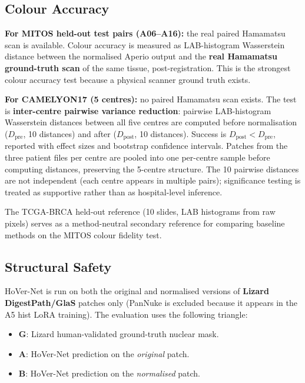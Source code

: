 \documentclass[a4paper,twoside,12pt]{report}
\begin{document}
\subsection{Colour Accuracy}

\textbf{For MITOS held-out test pairs (A06--A16):} the real paired Hamamatsu scan is available. Colour accuracy is measured as LAB-histogram Wasserstein distance between the normalised Aperio output and the \textbf{real Hamamatsu ground-truth scan} of the same tissue, post-registration. This is the strongest colour accuracy test because a physical scanner ground truth exists.

\textbf{For CAMELYON17 (5 centres):} no paired Hamamatsu scan exists. The test is \textbf{inter-centre pairwise variance reduction}: pairwise LAB-histogram Wasserstein distances between all five centres are computed before normalisation ($D_{\text{pre}}$, 10 distances) and after ($D_{\text{post}}$, 10 distances). Success is $D_{\text{post}} < D_{\text{pre}}$, reported with effect sizes and bootstrap confidence intervals. Patches from the three patient files per centre are pooled into one per-centre sample before computing distances, preserving the 5-centre structure. The 10 pairwise distances are not independent (each centre appears in multiple pairs); significance testing is treated as supportive rather than as hospital-level inference.

The TCGA-BRCA held-out reference (10 slides, LAB histograms from raw pixels) serves as a method-neutral secondary reference for comparing baseline methods on the MITOS colour fidelity test.

\subsection{Structural Safety}

HoVer-Net \citep{graham2019hovernet} is run on both the original and normalised versions of \textbf{Lizard DigestPath/GlaS} patches only (PanNuke is excluded because it appears in the A5 hist LoRA training). The evaluation uses the following triangle:

\begin{itemize}
    \item \textbf{G}: Lizard human-validated ground-truth nuclear mask.
    \item \textbf{A}: HoVer-Net prediction on the \emph{original} patch.
    \item \textbf{B}: HoVer-Net prediction on the \emph{normalised} patch.
\end{itemize}
\end{document}
